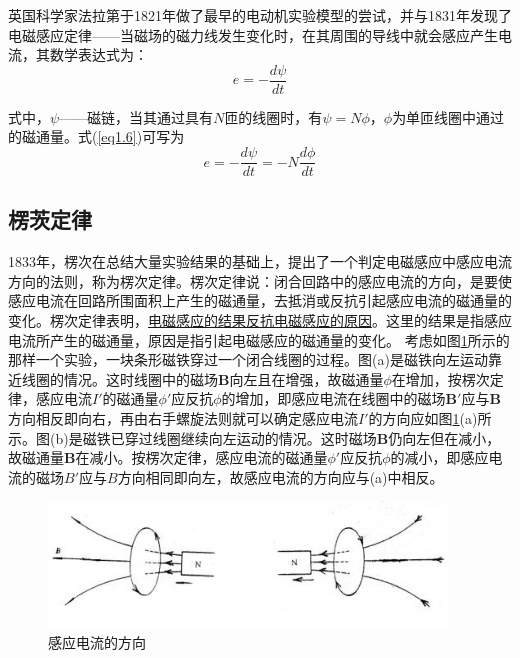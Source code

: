 \documentclass{book}
\begin{document}
英国科学家法拉第于1821年做了最早的电动机实验模型的尝试，并与1831年发现了电磁感应定律——当磁场的磁力线发生变化时，在其周围的导线中就会感应产生电流，其数学表达式为：
\begin{equation}
e=-\frac{d\psi }{dt}
\label{eq1.6}
\end{equation}

式中，$\psi $——磁链，当其通过具有$N$匝的线圈时，有$\psi =N\phi $，$\phi $为单匝线圈中通过的磁通量。式(\ref{eq1.6})可写为
\begin{equation}
e=-\frac{d\psi }{dt}=-N\frac{d\phi }{dt}
\label{eq1.7}
\end{equation}

\subsection{楞茨定律}
1833年，楞次在总结大量实验结果的基础上，提出了一个判定电磁感应中感应电流方向的法则，称为楞次定律。楞次定律说：闭合回路中的感应电流的方向，是要使感应电流在回路所围面积上产生的磁通量，去抵消或反抗引起感应电流的磁通量的变化。楞次定律表明，\uline{电磁感应的结果反抗电磁感应的原因}。这里的结果是指感应电流所产生的磁通量，原因是指引起电磁感应的磁通量的变化。
考虑如图\ref{fig: lengci}所示的那样一个实验，一块条形磁铁穿过一个闭合线圈的过程。图(a)是磁铁向左运动靠近线圈的情况。这时线圈中的磁场$\bm{B}$向左且在增强，故磁通量$\phi$在增加，按楞次定律，感应电流$I'$的磁通量$\phi'$应反抗$\phi$的增加，即感应电流在线圈中的磁场$\bm{B}'$应与$\bm{B}$方向相反即向右，再由右手螺旋法则就可以确定感应电流$I'$的方向应如图\ref{fig: lengci}(a)所示。图(b)是磁铁已穿过线圈继续向左运动的情况。这时磁场$\bm{B}$仍向左但在减小，故磁通量$\bm{B}$在减小。按楞次定律，感应电流的磁通量$\phi'$应反抗$\phi$的减小，即感应电流的磁场$B'$应与$B$方向相同即向左，故感应电流的方向应与(a)中相反。
\begin{figure}[H]
	\centering
	\includegraphics[width=25pc]{lengci}
	\caption{感应电流的方向}
	\label{fig: lengci}
\end{figure}
\end{document}
